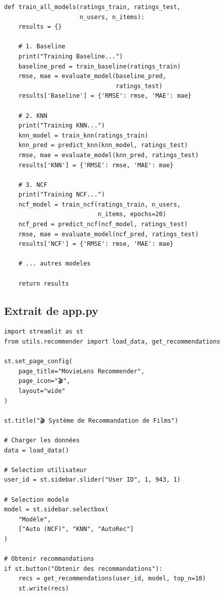 \documentclass[12pt,a4paper]{article}
\begin{document}
\begin{lstlisting}[style=pythonstyle, caption=Pipeline d'entraînement principal]
def train_all_models(ratings_train, ratings_test, 
                     n_users, n_items):
    results = {}
    
    # 1. Baseline
    print("Training Baseline...")
    baseline_pred = train_baseline(ratings_train)
    rmse, mae = evaluate_model(baseline_pred, 
                               ratings_test)
    results['Baseline'] = {'RMSE': rmse, 'MAE': mae}
    
    # 2. KNN
    print("Training KNN...")
    knn_model = train_knn(ratings_train)
    knn_pred = predict_knn(knn_model, ratings_test)
    rmse, mae = evaluate_model(knn_pred, ratings_test)
    results['KNN'] = {'RMSE': rmse, 'MAE': mae}
    
    # 3. NCF
    print("Training NCF...")
    ncf_model = train_ncf(ratings_train, n_users, 
                          n_items, epochs=20)
    ncf_pred = predict_ncf(ncf_model, ratings_test)
    rmse, mae = evaluate_model(ncf_pred, ratings_test)
    results['NCF'] = {'RMSE': rmse, 'MAE': mae}
    
    # ... autres modeles
    
    return results
\end{lstlisting}

\subsection{Extrait de app.py}

\begin{lstlisting}[style=pythonstyle, caption=Interface Streamlit principale]
import streamlit as st
from utils.recommender import load_data, get_recommendations

st.set_page_config(
    page_title="MovieLens Recommender",
    page_icon="🎬",
    layout="wide"
)

st.title("🎬 Système de Recommandation de Films")

# Charger les données
data = load_data()

# Selection utilisateur
user_id = st.sidebar.slider("User ID", 1, 943, 1)

# Selection modele
model = st.sidebar.selectbox(
    "Modèle",
    ["Auto (NCF)", "KNN", "AutoRec"]
)

# Obtenir recommandations
if st.button("Obtenir des recommandations"):
    recs = get_recommendations(user_id, model, top_n=10)
    st.write(recs)
\end{lstlisting}
\end{document}
